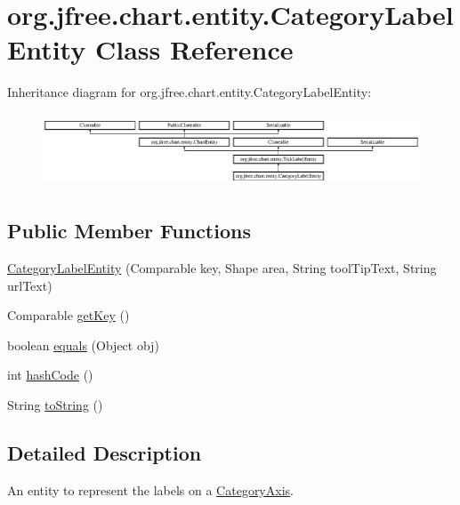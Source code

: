 \hypertarget{classorg_1_1jfree_1_1chart_1_1entity_1_1_category_label_entity}{}\section{org.\+jfree.\+chart.\+entity.\+Category\+Label\+Entity Class Reference}
\label{classorg_1_1jfree_1_1chart_1_1entity_1_1_category_label_entity}
Inheritance diagram for org.\+jfree.\+chart.\+entity.\+Category\+Label\+Entity\+:\begin{figure}[H]
\begin{center}
\leavevmode
\includegraphics[height=2.204725cm]{classorg_1_1jfree_1_1chart_1_1entity_1_1_category_label_entity}
\end{center}
\end{figure}
\subsection*{Public Member Functions}
\begin{DoxyCompactItemize}
\item 
\mbox{\hyperlink{classorg_1_1jfree_1_1chart_1_1entity_1_1_category_label_entity_a5297690f582995b1c0fd75c6f005a5f8}{Category\+Label\+Entity}} (Comparable key, Shape area, String tool\+Tip\+Text, String url\+Text)
\item 
Comparable \mbox{\hyperlink{classorg_1_1jfree_1_1chart_1_1entity_1_1_category_label_entity_ab967bb00e63106349b3bd64a02ecabd0}{get\+Key}} ()
\item 
boolean \mbox{\hyperlink{classorg_1_1jfree_1_1chart_1_1entity_1_1_category_label_entity_a278e8fe066179035aa9bd1e601aee6e2}{equals}} (Object obj)
\item 
int \mbox{\hyperlink{classorg_1_1jfree_1_1chart_1_1entity_1_1_category_label_entity_a54cf9f13a7c0728495a0d45750f08191}{hash\+Code}} ()
\item 
String \mbox{\hyperlink{classorg_1_1jfree_1_1chart_1_1entity_1_1_category_label_entity_a15d1b33dd90ea892cd04f83d08a372b2}{to\+String}} ()
\end{DoxyCompactItemize}


\subsection{Detailed Description}
An entity to represent the labels on a \mbox{\hyperlink{}{Category\+Axis}}.

